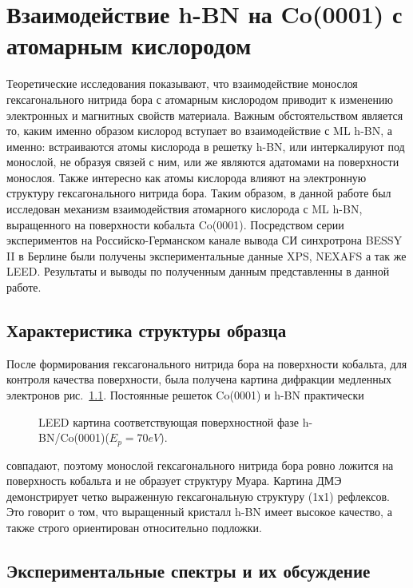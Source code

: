 \chapter{Взаимодействие h-BN на Co(0001) с атомарным кислородом} \label{chapt3}

Теоретические исследования показывают, что взаимодействие монослоя гексагонального 
нитрида бора с атомарным кислородом приводит к изменению электронных и магнитных
свойств материала. Важным обстоятельством является то, каким именно образом кислород
вступает во взаимодействие с ML h-BN, а именно: встраиваются атомы кислорода в решетку 
h-BN, или интеркалируют под монослой, не образуя связей с ним, или же являются 
адатомами на поверхности монослоя. Также интересно как атомы кислорода влияют на 
электронную структуру гексагонального нитрида бора. Таким образом, в данной работе был 
исследован механизм взаимодействия атомарного кислорода с ML h-BN, выращенного на 
поверхности кобальта Co(0001). Посредством серии экспериментов на Российско-Германском
канале вывода СИ синхротрона BESSY II в Берлине были получены экспериментальные 
данные XPS, NEXAFS а так же LEED. Результаты и выводы по полученным данным 
представленны в данной работе.

\section{Характеристика структуры образца}

После формирования гексагонального нитрида бора на поверхности кобальта, для контроля
качества  поверхности, была получена картина дифракции медленных электронов
рис.~\ref{pic:LEED}. Постоянные решеток Co(0001) и h-BN практически  
\begin{figure}[!ht]
\caption{LEED картина соответствующая поверхностной фазе h-BN/Co(0001)($E_p = 70 eV$).}
\label{pic:LEED}
\end{figure}
совпадают, поэтому монослой гексагонального нитрида бора ровно ложится на поверхность
кобальта и не образует структуру Муара.
Картина ДМЭ демонстрирует четко выраженную гексагональную структуру (1х1) рефлексов.
Это говорит о том, что выращенный кристалл h-BN имеет высокое качество, а также строго 
ориентирован относительно подложки.

\section{Экспериментальные спектры и их обсуждение}

